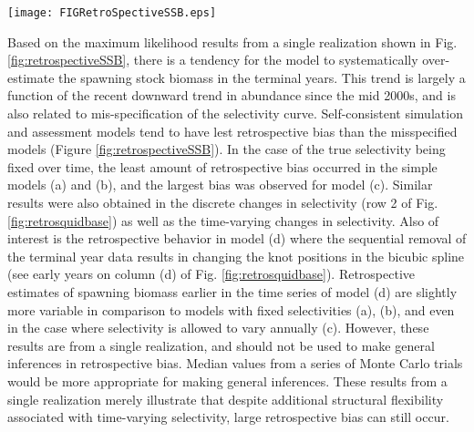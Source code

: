 \documentclass[review,letterpaper,10pt,authoryear]{elsarticle}
\begin{document}
\begin{figure*}[!tbh]
	\begin{center}
		\texttt{[image: FIGRetroSpectiveSSB.eps]}
	\end{center}
	\caption{One realization of retrospective estimates of spawning biomass for simulated Pacific hake populations where four years of data was sequentially removed from.  The true spawning biomass used to simulated the data is included for reference.}
	\label{fig:retrospectiveSSB}
\end{figure*}

Based on the maximum likelihood results from a single realization shown in Fig. \ref{fig:retrospectiveSSB}, there is a tendency for the model to systematically over-estimate the spawning stock biomass in the terminal years.  This trend is largely a function of the recent downward trend in abundance since the mid 2000s, and is also related to mis-specification of the selectivity curve.  Self-consistent simulation and assessment  models tend to have lest retrospective bias than the misspecified models (Figure \ref{fig:retrospectiveSSB}).  In the case of the true selectivity being fixed over time, the least amount of retrospective bias occurred in the simple models (a) and (b), and the largest bias was observed for model (c).  Similar results were also obtained in the discrete changes in selectivity (row 2 of Fig. \ref{fig:retrosquidbase}) as well as the time-varying changes in selectivity.  Also of interest is the retrospective behavior in model (d) where the sequential removal of the terminal year data results in changing the knot positions in the bicubic spline (see early years on column (d) of Fig. \ref{fig:retrosquidbase}). Retrospective  estimates of spawning biomass earlier in the time series of model (d) are slightly more variable in comparison to models with fixed selectivities (a), (b), and even in the case where selectivity is allowed to vary annually (c).  However, these results are from a single realization, and should not be used to make general inferences in retrospective bias.  Median values from a series of Monte Carlo trials would be more appropriate for making general inferences.  These results from a single realization merely illustrate that despite additional structural flexibility associated with time-varying selectivity, large retrospective bias can still occur. 



\end{document}

